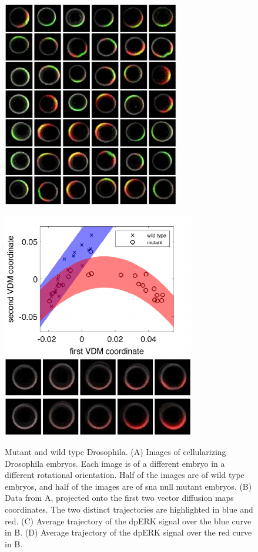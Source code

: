 \documentclass{pnastwo}
\begin{document}
\begin{article}
\begin{figure}[t]
\includegraphics[height=9cm]{raw_data3}
\begin{minipage}[b]{8.5cm}
\includegraphics[width=8.4cm]{mut_wt_vdm_embedding}
\includegraphics[width=8.4cm]{wt_trajectory}
\includegraphics[width=8.4cm]{mut_trajectory}
\end{minipage}
\caption{Mutant and wild type {\xfigtextfontit Drosophila}. {\xfigtextfontit (A)} Images of cellularizing {\xfigtextfontit Drosophila} embryos. Each image is of a different embryo in a different rotational orientation. Half of the images are of wild type embryos, and half of the images are of sna null mutant embryos. {\xfigtextfontit(B)} Data from {\xfigtextfontit A}, projected onto the first two vector diffusion maps coordinates. The two distinct trajectories are highlighted in blue and red. {\xfigtextfontit (C)} Average trajectory of the dpERK signal over the blue curve in {\xfigtextfontit B}. {\xfigtextfontit (D)} Average trajectory of the dpERK signal over the red curve in {\xfigtextfontit B}.}

\end{figure}
\end{article}
\end{document}
